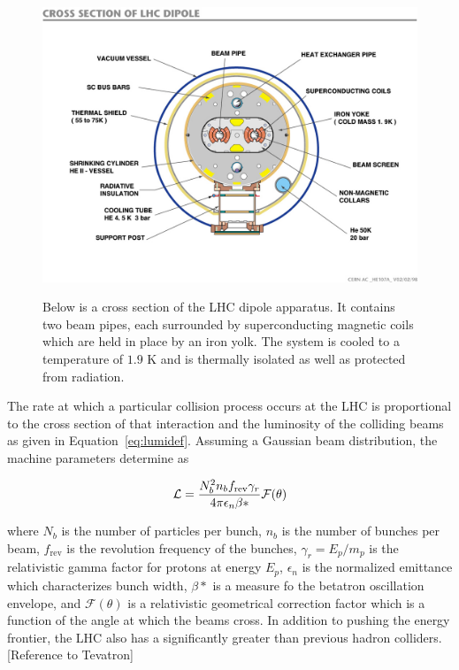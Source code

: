 \begin{figure}[tb]
\caption[The LHC dipole]{
 Below is a cross section of the LHC dipole apparatus.
 It contains two beam pipes, each surrounded
  by superconducting magnetic coils
  which are held in place by an iron yolk.
 The system is cooled to a temperature of
  $1.9$ K and is thermally isolated 
  as well as protected from radiation.
 }
\includegraphics[width=\textwidth]{pdfs/experiment/lhc_dipole.jpg}
\label{fig:lhc_dipole}
\end{figure}


The rate at which a particular collision 
 process occurs
 at the LHC is proportional to 
 the cross section of that interaction
 and the luminosity of the colliding beams
 as given in Equation~\ref{eq:lumidef}.
Assuming a Gaussian beam distribution,
 the machine parameters determine \lumi as

\begin{equation}\label{eq:lumi}
 \mathcal L=\frac{N_b^2 n_b f_{\mathrm{rev}} \gamma_r}{4\pi\epsilon_n \beta*}\mathcal{F}(\theta)
\end{equation}

 where $N_b$ is the number of particles per bunch,
 $n_b$ is the number of bunches per beam,
 $f_{\mathrm{rev}}$ is the revolution frequency of the bunches,
 $\gamma_r=E_p/m_p$ is the relativistic gamma factor
  for protons at energy $E_p$,
 $\epsilon_n$ is the normalized emittance which 
  characterizes bunch width,
 $\beta*$ is a measure fo the betatron oscillation envelope,
 and $\mathcal{F}(\theta)$ is a relativistic geometrical 
 correction factor which is a function of the
 angle at which the beams cross.
In addition to pushing the energy frontier,
 the LHC also has a significantly greater
 \lumi than previous hadron colliders. 
[Reference to Tevatron]
 
